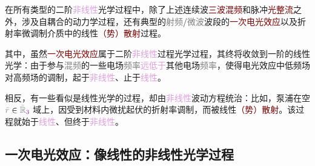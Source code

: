 在所有类型的二阶\textcolor{Plum}{非线性}光学过程中，除了上述连续波\textcolor{Maroon}{三波混频}和\textcolor{NavyBlue}{脉冲}\textcolor{Maroon}{光整流}之外，涉及\textcolor{NavyBlue}{自耦合}的动力学过程，还有典型的\textcolor{gray}{射频}/\textcolor{gray}{微波}波段的\textcolor{Maroon}{一次电光效应}以及\textcolor{PineGreen}{折射率微调制}介质中的线性\textcolor{Maroon}{（势）散射}过程。

其中，虽然\textcolor{Maroon}{一次电光效应}属于二阶\textcolor{Plum}{非线性}过程光学过程，其终将收敛到一阶的线性光学：由于参与\textcolor{gray}{混频}的一些电场\textcolor{gray}{频率}\textcolor{Plum}{远低于}其他电场\textcolor{gray}{频率}，使得电光效应中\textcolor{NavyBlue}{低频场}对\textcolor{NavyBlue}{高频场}的调制，起于\textcolor{Plum}{非线性}、止于\textcolor{Plum}{线性}。

相反，有一些看似是\textcolor{PineGreen}{线性光学}的过程，却由\textcolor{Plum}{非线性}波动方程统治：比如，\textcolor{NavyBlue}{泵浦}在空 $\mathcolor{gray}{\bar{r}} \in \mathcolor{gray}{\bar{\mathbb{R}}_{\textcolor{Plum}{3}}}$ 域上，因受到材料内\textcolor{NavyBlue}{微扰起伏}的\textcolor{PineGreen}{折射率}\textcolor{NavyBlue}{调制}，而被线性\textcolor{Maroon}{（势）散射}。该过程就始于\textcolor{Plum}{线性}、但终于\textcolor{Plum}{非线性}。

\subsection{一次电光效应：像线性的非线性光学过程}\label{ssec:cross-correlation}

